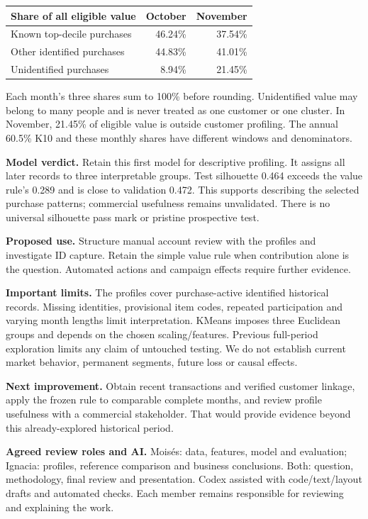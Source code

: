 \documentclass[10pt,a4paper]{article}
\newcommand{\heading}[1]{\vspace{.3em}{\large\bfseries\color{navy}#1}\par}
\begin{document}
\begin{tabularx}{\linewidth}{@{}Yrr@{}}
\toprule\textbf{Share of all eligible value} & \textbf{October} & \textbf{November} \\ \midrule
Known top-decile purchases & 46.24\% & 37.54\% \\
Other identified purchases & 44.83\% & 41.01\% \\
Unidentified purchases & 8.94\% & 21.45\% \\
\bottomrule\end{tabularx}
Each month's three shares sum to 100\% before rounding. Unidentified value may belong to many people and is never treated as one customer or one cluster. In November, 21.45\% of eligible value is outside customer profiling. The annual 60.5\% K10 and these monthly shares have different windows and denominators.

\heading{6. Model verdict, limit and improvement}
\textbf{Model verdict.} Retain this first model for descriptive profiling. It assigns all later records to three interpretable groups. Test silhouette 0.464 exceeds the value rule's 0.289 and is close to validation 0.472. This supports describing the selected purchase patterns; commercial usefulness remains unvalidated. There is no universal silhouette pass mark or pristine prospective test.

\textbf{Proposed use.} Structure manual account review with the profiles and investigate ID capture. Retain the simple value rule when contribution alone is the question. Automated actions and campaign effects require further evidence.

\textbf{Important limits.} The profiles cover purchase-active identified historical records. Missing identities, provisional item codes, repeated participation and varying month lengths limit interpretation. KMeans imposes three Euclidean groups and depends on the chosen scaling/features. Previous full-period exploration limits any claim of untouched testing. We do not establish current market behavior, permanent segments, future loss or causal effects.

\textbf{Next improvement.} Obtain recent transactions and verified customer linkage, apply the frozen rule to comparable complete months, and review profile usefulness with a commercial stakeholder. That would provide evidence beyond this already-explored historical period.

\textbf{Agreed review roles and AI.} Mois\'es: data, features, model and evaluation; Ignacia: profiles, reference comparison and business conclusions. Both: question, methodology, final review and presentation. Codex assisted with code/text/layout drafts and automated checks. Each member remains responsible for reviewing and explaining the work.
\end{document}
